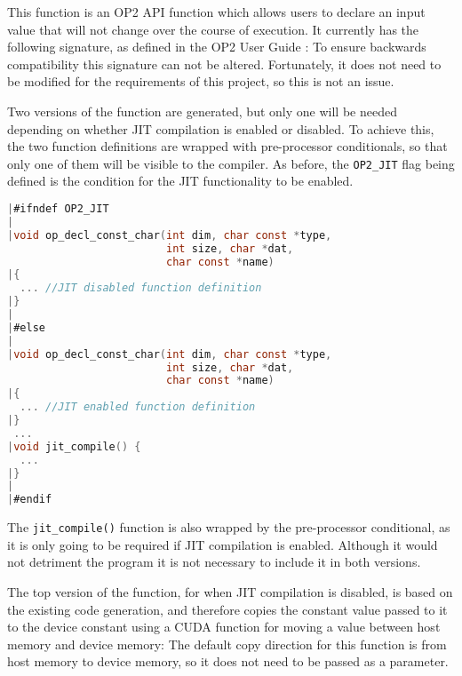 \clearpage
{}
This function is an OP2 API function which allows users to declare an input value that will not change over the course of execution. It currently has the following signature, as defined in the OP2 User Guide \cite[p9]{manual}:
To ensure backwards compatibility this signature can not be altered. Fortunately, it does not need to be modified for the requirements of this project, so this is not an issue.
\par
Two versions of the function are generated, but only one will be needed depending on whether JIT compilation is enabled or disabled. To achieve this, the two function definitions are wrapped with pre-processor conditionals, so that only one of them will be visible to the compiler. As before, the \verb|OP2_JIT| flag being defined is the condition for the JIT functionality to be enabled.
\begin{lstlisting}[backgroundcolor=\color{red!20}, language=C]
|#ifndef OP2_JIT
|
|void op_decl_const_char(int dim, char const *type,
                         int size, char *dat,
                         char const *name)
|{
  ... //JIT disabled function definition
|}
|
|#else
|
|void op_decl_const_char(int dim, char const *type,
                         int size, char *dat,
                         char const *name)
|{
  ... //JIT enabled function definition
|}
 ...
|void jit_compile() {
  ...
|}
|
|#endif
\end{lstlisting}
The \verb|jit_compile()| function is also wrapped by the pre-processor conditional, as it is only going to be required if JIT compilation is enabled. Although it would not detriment the program it is not necessary to include it in both versions.

 The top version of the function, for when JIT compilation is disabled, is based on the existing code generation, and therefore copies the constant value passed to it to the device constant using a CUDA function for moving a value between host memory and device memory:
\noindent The default copy direction for this function is from host memory to device memory, so it does not need to be passed as a parameter.

